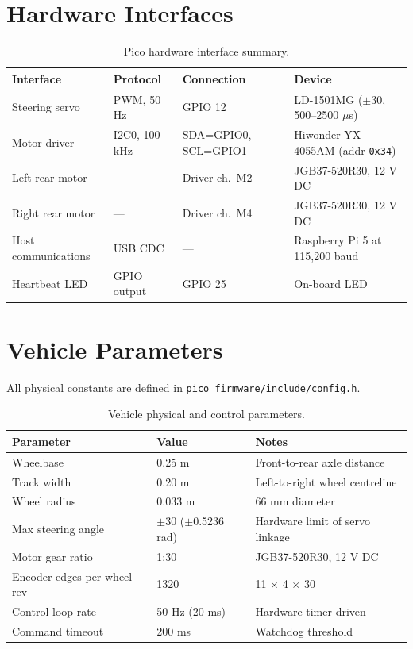 \documentclass[12pt,a4paper]{report}
\begin{document}
\section{Hardware Interfaces}

\begin{table}[H]
\centering
\caption{Pico hardware interface summary.}
\label{tab:pico_hw}
\begin{tabularx}{\textwidth}{|p{2.8cm}|p{2cm}|p{2.8cm}|X|}
\hline
\textbf{Interface} & \textbf{Protocol} & \textbf{Connection} & \textbf{Device} \\
\hline
Steering servo & PWM, 50 Hz & GPIO 12 & LD-1501MG ($\pm$30\textdegree{}, 500--2500 $\mu$s) \\
\hline
Motor driver & I2C0, 100 kHz & SDA=GPIO0, SCL=GPIO1 & Hiwonder YX-4055AM (addr \texttt{0x34}) \\
\hline
Left rear motor & --- & Driver ch.\ M2 & JGB37-520R30, 12 V DC \\
\hline
Right rear motor & --- & Driver ch.\ M4 & JGB37-520R30, 12 V DC \\
\hline
Host communications & USB CDC & --- & Raspberry Pi 5 at 115,200 baud \\
\hline
Heartbeat LED & GPIO output & GPIO 25 & On-board LED \\
\hline
\end{tabularx}
\end{table}

\section{Vehicle Parameters}

All physical constants are defined in \texttt{pico\_firmware/include/config.h}.

\begin{table}[H]
\centering
\caption{Vehicle physical and control parameters.}
\label{tab:vehicle_params}
\begin{tabularx}{\textwidth}{|p{4.5cm}|p{3cm}|X|}
\hline
\textbf{Parameter} & \textbf{Value} & \textbf{Notes} \\
\hline
Wheelbase & 0.25 m & Front-to-rear axle distance \\
\hline
Track width & 0.20 m & Left-to-right wheel centreline \\
\hline
Wheel radius & 0.033 m & 66 mm diameter \\
\hline
Max steering angle & $\pm$30\textdegree{} ($\pm$0.5236 rad) & Hardware limit of servo linkage \\
\hline
Motor gear ratio & 1:30 & JGB37-520R30, 12 V DC \\
\hline
Encoder edges per wheel rev & 1320 & 11 $\times$ 4 $\times$ 30 \\
\hline
Control loop rate & 50 Hz (20 ms) & Hardware timer driven \\
\hline
Command timeout & 200 ms & Watchdog threshold \\
\hline
\end{tabularx}
\end{table}
\end{document}
